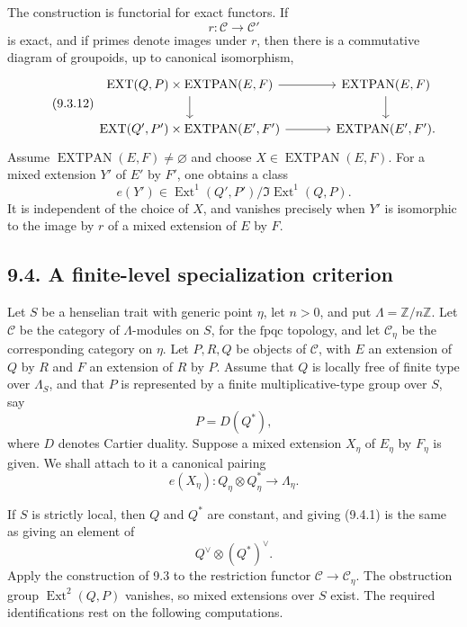 \documentclass[11pt]{article}
\newcommand{\Ext}{\operatorname{Ext}}
\newcommand{\Z}{\mathbb Z}
\newcommand{\EXTPAN}{\operatorname{EXTPAN}}
\newcommand{\EXT}{\operatorname{EXT}}
\newcommand{\fpqc}{\mathrm{fpqc}}
\newcommand{\calC}{\mathcal C}
\begin{document}
The construction is functorial for exact functors.  If
\begin{equation}\tag{9.3.11}
        r:\calC\longrightarrow\calC'
\end{equation}
is exact, and if primes denote images under \(r\), then there is a commutative diagram of groupoids, up to canonical isomorphism,
\begin{equation}\tag{9.3.12}
\begin{tikzcd}[column sep=large]
\EXT(Q,P)\times\EXTPAN(E,F)\arrow[r]\arrow[d]&\EXTPAN(E,F)\arrow[d]\\
\EXT(Q',P')\times\EXTPAN(E',F')\arrow[r]&\EXTPAN(E',F').
\end{tikzcd}
\end{equation}
Assume \(\EXTPAN(E,F)\ne\varnothing\) and choose \(X\in\EXTPAN(E,F)\).  For a mixed extension \(Y'\) of \(E'\) by \(F'\), one obtains a class
\begin{equation}\tag{9.3.13}
        e(Y')\in\Ext^1(Q',P')/\Im\Ext^1(Q,P).
\end{equation}
It is independent of the choice of \(X\), and vanishes precisely when \(Y'\) is isomorphic to the image by \(r\) of a mixed extension of \(E\) by \(F\).

\subsection*{9.4. A finite-level specialization criterion}
Let \(S\) be a henselian trait with generic point \(\eta\), let \(n>0\), and put \(\Lambda=\Z/n\Z\).  Let \(\calC\) be the category of \(\Lambda\)-modules on \(S\), for the \(\fpqc\) topology, and let \(\calC_\eta\) be the corresponding category on \(\eta\).  Let \(P,R,Q\) be objects of \(\calC\), with \(E\) an extension of \(Q\) by \(R\) and \(F\) an extension of \(R\) by \(P\).  Assume that \(Q\) is locally free of finite type over \(\Lambda_S\), and that \(P\) is represented by a finite multiplicative-type group over \(S\), say
\begin{equation}\tag{9.4.0}
        P=D(Q^*),
\end{equation}
where \(D\) denotes Cartier duality.  Suppose a mixed extension \(X_\eta\) of \(E_\eta\) by \(F_\eta\) is given.  We shall attach to it a canonical pairing
\begin{equation}\tag{9.4.1}
        e(X_\eta): Q_\eta\otimes Q^*_\eta\longrightarrow \Lambda_\eta.
\end{equation}

If \(S\) is strictly local, then \(Q\) and \(Q^*\) are constant, and giving (9.4.1) is the same as giving an element of
\begin{equation}\tag{9.4.2}
        Q^\vee\otimes (Q^*)^\vee.
\end{equation}
Apply the construction of 9.3 to the restriction functor \(\calC\to\calC_\eta\).  The obstruction group \(\Ext^2(Q,P)\) vanishes, so mixed extensions over \(S\) exist.  The required identifications rest on the following computations.
\end{document}
